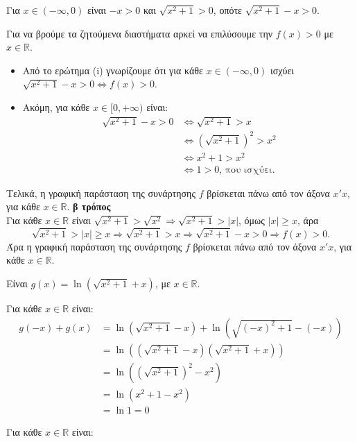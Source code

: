 \begin{alist}
\item 
\begin{rlist}
\item Για $x \in (-\infty, 0)$ είναι $-x > 0$ και $\sqrt{x^2+1} > 0$, οπότε $\sqrt{x^2+1} - x > 0$.
\item Για να βρούμε τα ζητούμενα διαστήματα αρκεί να επιλύσουμε την $f(x) > 0$ με $x \in \mathbb{R}$.
\begin{itemize}
\item Από το ερώτημα (i) γνωρίζουμε ότι για κάθε $x \in (-\infty, 0)$ ισχύει \\
$\sqrt{x^2+1} - x > 0 \Leftrightarrow f(x) > 0$.
\item Ακόμη, για κάθε $x \in [0, +\infty)$ είναι:
\begin{align*}
\sqrt{x^2+1} - x > 0 &\Leftrightarrow \sqrt{x^2+1} > x \\
&\Leftrightarrow \left(\sqrt{x^2+1}\right)^2 > x^2 \\
&\Leftrightarrow x^2 + 1 > x^2 \\
&\Leftrightarrow 1 > 0 \text{, που ισχύει.}
\end{align*}
\end{itemize}
Τελικά, η γραφική παράσταση της συνάρτησης $f$ βρίσκεται πάνω από τον άξονα $x'x$, για κάθε $x \in \mathbb{R}$.
\textbf{β τρόπος} \\
Για κάθε $x \in \mathbb{R}$ είναι $\sqrt{x^2+1} > \sqrt{x^2} \Rightarrow \sqrt{x^2+1} > |x|$, όμως $|x| \ge x$, άρα
\[\sqrt{x^2+1} > |x| \ge x \Rightarrow \sqrt{x^2+1} > x \Rightarrow \sqrt{x^2+1} - x > 0 \Rightarrow f(x) > 0.\]
Άρα η γραφική παράσταση της συνάρτησης $f$ βρίσκεται πάνω από τον άξονα $x'x$, για κάθε $x \in \mathbb{R}$.
\end{rlist}
\item Είναι $g(x) = \ln\left(\sqrt{x^2+1} + x\right)$, με $x \in \mathbb{R}$.
\begin{rlist}
\item Για κάθε $x \in \mathbb{R}$ είναι:
\begin{align*}
g(-x) + g(x) &= \ln\left(\sqrt{x^2+1}-x\right) + \ln\left(\sqrt{(-x)^2+1}-(-x)\right) \\
&= \ln\left(\left(\sqrt{x^2+1}-x\right)\left(\sqrt{x^2+1}+x\right)\right) \\
&= \ln\left(\left(\sqrt{x^2+1}\right)^2 - x^2\right) \\
&= \ln\left(x^2+1-x^2\right) \\
&= \ln 1 = 0
\end{align*}
\item Για κάθε $x \in \mathbb{R}$ είναι:
\end{rlist}
\end{alist}

